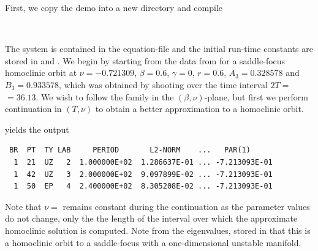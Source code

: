 \documentclass[12pt]{report}
\begin{document}
First, we copy the demo into a new directory and compile
\begin{center}
 \\
\end{center}
The system is contained in 
the equation-file  and the initial run-time constants
are stored in  and . We begin by starting from
the data from  for a saddle-focus homoclinic orbit 
at 
$\nu=-0.721309$, $\beta=0.6$, $\gamma=0$, $r=0.6$, $A_3=0.328578$ 
and $B_3=0.933578$, which was obtained by shooting over 
the time interval $2T=$$=36.13$.
We wish to follow the family in the $(\beta,\nu)$-plane, but 
first we perform continuation in $(T,\nu)$ to obtain a better 
approximation to a homoclinic orbit.
\begin{center}
\end{center} 
yields the output
\begin{verbatim}
 BR  PT  TY LAB     PERIOD       L2-NORM    ...   PAR(1)     
  1  21  UZ   2  1.000000E+02  1.286637E-01 ... -7.213093E-01
  1  42  UZ   3  2.000000E+02  9.097899E-02 ... -7.213093E-01
  1  50  EP   4  2.400000E+02  8.305208E-02 ... -7.213093E-01
\end{verbatim}
Note that $\nu=$ remains constant during the continuation
as the parameter values do not change, only the the length of
the interval over which the approximate homoclinic solution is computed.
Note from the eigenvalues, stored in  that this is a homoclinic
orbit to a saddle-focus with a one-dimensional unstable manifold.
\end{document}
